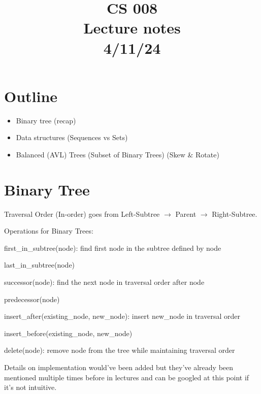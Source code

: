 \documentclass[11pt,a4paper,english]{paper}
\begin{document}
\title{CS 008 \\ Lecture notes \\ 4/11/24}
\maketitle

\section{Outline}

\begin{itemize}

  \item Binary tree (recap)
  \item Data structures (Sequences vs Sets)
  \item Balanced (AVL) Trees (Subset of Binary Trees) (Skew \& Rotate)

\end{itemize}

\section{Binary Tree}

Traversal Order (In-order) goes from Left-Subtree $\rightarrow$ Parent $\rightarrow$ Right-Subtree.

\bigskip
\begin{bluebox}{Operations for Binary Trees:} {
\begin{itemize} {

\item first\_in\_subtree(node): find first node in the subtree defined by node
\item last\_in\_subtree(node)
\item successor(node): find the next node in traversal order after node
\item predecessor(node)
\item insert\_after(existing\_node, new\_node): insert new\_node in traversal order
\item insert\_before(existing\_node, new\_node)
\item delete(node): remove node from the tree while maintaining traversal order

}\end{itemize}
}\end{bluebox}

\bigskip
\noindent Details on implementation would've been added but they've already been mentioned multiple times before in lectures and can be googled at this point if it's not intuitive.
\end{document}
